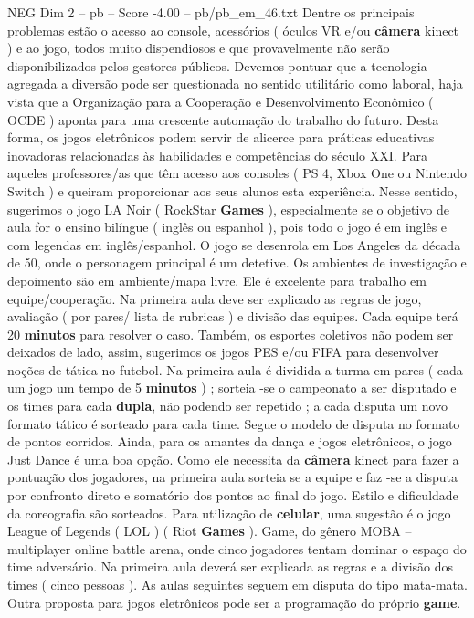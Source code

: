 \begin{textsample}{NEG Dim 2 – pb – Score -4.00 – pb/pb\_em\_46.txt}
Dentre os principais problemas estão o acesso ao console, acessórios ( óculos VR e/ou \textbf{câmera} kinect ) e ao jogo, todos muito dispendiosos e que provavelmente não serão disponibilizados pelos gestores públicos.
Devemos pontuar que a tecnologia agregada a diversão pode ser questionada no sentido utilitário como laboral, haja vista que a Organização para a Cooperação e Desenvolvimento Econômico ( OCDE ) aponta para uma crescente automação do trabalho do futuro.
Desta forma, os jogos eletrônicos podem servir de alicerce para práticas educativas inovadoras relacionadas às habilidades e competências do século XXI.
Para aqueles professores/as que têm acesso aos consoles ( PS 4, Xbox One ou Nintendo Switch ) e queiram proporcionar aos seus alunos esta experiência.
Nesse sentido, sugerimos o jogo LA Noir ( RockStar \textbf{Games} ), especialmente se o objetivo de aula for o ensino bilíngue ( inglês ou espanhol ), pois todo o jogo é em inglês e com legendas em inglês/espanhol.
O jogo se desenrola em Los Angeles da década de 50, onde o personagem principal é um detetive.
Os ambientes de investigação e depoimento são em ambiente/mapa livre.
Ele é excelente para trabalho em equipe/cooperação.
Na primeira aula deve ser explicado as regras de jogo, avaliação ( por pares/ lista de rubricas ) e divisão das equipes.
Cada equipe terá 20 \textbf{minutos} para resolver o caso.
Também, os esportes coletivos não podem ser deixados de lado, assim, sugerimos os jogos PES e/ou FIFA para desenvolver noções de tática no futebol.
Na primeira aula é dividida a turma em pares ( cada um jogo um tempo de 5 \textbf{minutos} ) ; sorteia -se o campeonato a ser disputado e os times para cada \textbf{dupla}, não podendo ser repetido ; a cada disputa um novo formato tático é sorteado para cada time.
Segue o modelo de disputa no formato de pontos corridos.
Ainda, para os amantes da dança e jogos eletrônicos, o jogo Just Dance é uma boa opção.
Como ele necessita da \textbf{câmera} kinect para fazer a pontuação dos jogadores, na primeira aula sorteia se a equipe e faz -se a disputa por confronto direto e somatório dos pontos ao final do jogo.
Estilo e dificuldade da coreografia são sorteados.
Para utilização de \textbf{celular}, uma sugestão é o jogo League of Legends ( LOL ) ( Riot \textbf{Games} ).
Game, do gênero MOBA – multiplayer online battle arena, onde cinco jogadores tentam dominar o espaço do time adversário.
Na primeira aula deverá ser explicada as regras e a divisão dos times ( cinco pessoas ).
As aulas seguintes seguem em disputa do tipo mata-mata.
Outra proposta para jogos eletrônicos pode ser a programação do próprio \textbf{game}.

\end{textsample}
